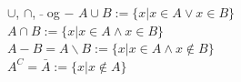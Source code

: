 \begin{frame}{$\cup$, $\cap$, $\bar{}$ og $-$}
    $A \cup B := \{x | x \in A \lor x \in B\}$ \\
    $A \cap B := \{x | x \in A \land x \in B\}$\\
    $A - B = A \backslash B := \{x | x \in A\land  x \notin B\}$\\
    $A^C = \bar{A} := \{x | x \notin A\}$
    

    \begin{figure}%
        \centering
        \qquad
        \qquad
        \qquad
        \label{fig:example2}%
    \end{figure}
\end{frame}

